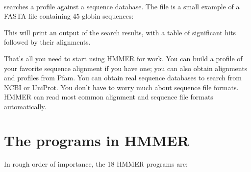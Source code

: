   \vspace{1ex}
   \\
  \vspace{1ex}

 searches a profile against a sequence database.  The
file  is a small example of a FASTA file
containing 45 globin sequences:

  \vspace{1ex}
  \vspace{1ex}
  
This will print an output of the search results, with a table of
significant hits followed by their alignments.

That's all you need to start using HMMER for work. You can build
a profile of your favorite sequence alignment if you have one; you can
also obtain alignments and profiles from
Pfam. You can
obtain real sequence databases to search from
NCBI
or
UniProt.
You don't have to worry much about sequence file formats. HMMER can
read most common alignment and sequence file formats
automatically. 
  
  


\section {The programs in HMMER}

In rough order of importance, the 18 HMMER programs are:

